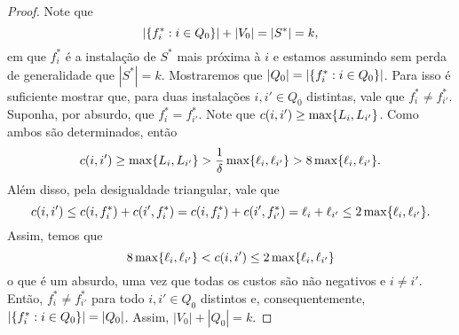 \begin{proof}
    Note que 
    \begin{equation}
        |\{f_i^* : i \in Q_0\}| + |V_0| = |S^*| = k \nonumber,
    \end{equation}
    em que $f_i^*$ é a instalação de $S^*$ mais próxima à $i$ e estamos assumindo sem perda de generalidade que $|S^*| = k$. Mostraremos que $ |Q_0| = |\{f_i^* : i \in Q_0\}|$. Para isso é suficiente mostrar que, para duas instalações $i,i' \in Q_0$ distintas, vale que $f_i^* \neq f_{i'}^*$. Suponha, por absurdo, que $f_i^* = f_{i'}^*$. Note que $c(i,i') \geq \max\{L_i,L_{i'}\}$. Como ambos são determinados, então 
    \begin{equation}
        c(i,i') \geq \max\{L_i,L_{i'}\} > \frac{1}{\delta}\max\{\ell_i,\ell_{i'}\} > 8 \max\{\ell_i,\ell_{i'}\}. \nonumber
    \end{equation}
    Além disso, pela desigualdade triangular, vale que 
    \begin{equation}
        c(i,i') \leq c(i,f_i^*) + c(i',f_i^*) = c(i,f_i^*) + c(i',f_{i'}^*) = \ell_i + \ell_{i'}\leq 2 \max\{\ell_i,\ell_{i'}\}. \nonumber
    \end{equation}
    Assim, temos que
    \[ 8 \max\{\ell_i,\ell_{i'}\} < c(i,i') \leq 2 \max\{\ell_i,\ell_{i'}\}\]
    o que é um absurdo, uma vez que todas os custos são não negativos e $i \neq i'$. Então, $f_i^* \neq f_{i'}^*$ para todo $i,i' \in Q_0$ distintos e, consequentemente, ${|\{f_i^*: i \in Q_0\}| = |Q_0|}$. Assim, $|V_0| + |Q_0| = k$. 
    \end{proof}

